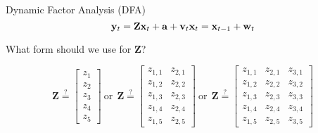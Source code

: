 \documentclass[
  ignorenonframetext,
]{beamer}
\begin{document}
\begin{frame}{Dynamic Factor Analysis (DFA)}
\protect\hypertarget{dynamic-factor-analysis-dfa-1}{}
\[
\mathbf{y}_t = \mathbf{Z} \mathbf{x}_t + \mathbf{a} + \mathbf{v}_t \\
\mathbf{x}_t = \mathbf{x}_{t-1} + \mathbf{w}_t
\]

What form should we use for \(\mathbf{Z}\)?

\[
\mathbf{Z} \stackrel{?}{=}
\begin{bmatrix}
 z_1 \\
 z_2 \\
 z_3 \\
 z_4 \\
 z_5
\end{bmatrix}
~\text{or}~~
\mathbf{Z} \stackrel{?}{=}
\begin{bmatrix}
 z_{1,1} & z_{2,1} \\
 z_{1,2} & z_{2,2} \\
 z_{1,3} & z_{2,3} \\
 z_{1,4} & z_{2,4} \\
 z_{1,5} & z_{2,5}
\end{bmatrix}
~\text{or}~~
\mathbf{Z} \stackrel{?}{=}
\begin{bmatrix}
 z_{1,1} & z_{2,1} & z_{3,1} \\
 z_{1,2} & z_{2,2} & z_{3,2} \\
 z_{1,3} & z_{2,3} & z_{3,3} \\
 z_{1,4} & z_{2,4} & z_{3,4} \\
 z_{1,5} & z_{2,5} & z_{3,5}
\end{bmatrix}
\]
\end{frame}
\end{document}
